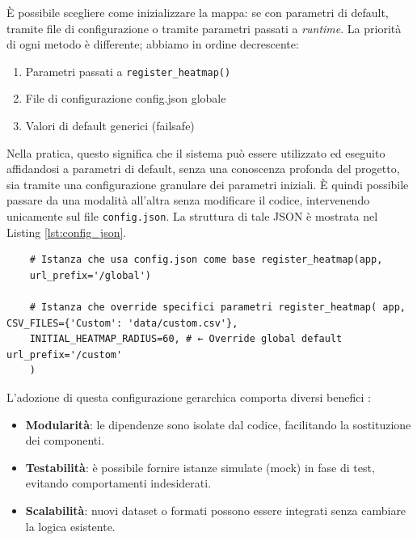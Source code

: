 È possibile scegliere come inizializzare la mappa: se con parametri di default, tramite
file di configurazione o tramite parametri passati a \textit{runtime}. La priorità
di ogni metodo è differente; abbiamo in ordine decrescente:

\begin{enumerate}
  \item Parametri passati a \texttt{register\_heatmap()}

  \item File di configurazione config.json globale

  \item Valori di default generici (failsafe)
\end{enumerate}

\noindent
Nella pratica, questo significa che il sistema può essere utilizzato ed eseguito
affidandosi a parametri di default, senza una conoscenza profonda del progetto,
sia tramite una configurazione granulare dei parametri iniziali. È quindi possibile
passare da una modalità all'altra senza modificare il codice, intervenendo
unicamente sul file \texttt{config.json}. La struttura di tale JSON è mostrata
nel Listing \ref{lst:config_json}.

\begin{listing}
  [H]
  \caption{Metodi per inizializzare la mappa}
  \label{lst:register_hm}
  \begin{verbatim}
    # Istanza che usa config.json come base register_heatmap(app,
    url_prefix='/global')

    # Istanza che override specifici parametri register_heatmap( app, CSV_FILES={'Custom': 'data/custom.csv'},
    INITIAL_HEATMAP_RADIUS=60, # ← Override global default url_prefix='/custom'
    )
  \end{verbatim}
\end{listing}

\noindent
L'adozione di questa configurazione gerarchica comporta diversi benefici \cite{dependency-injection-wiki}:

\begin{itemize}
  \item \textbf{Modularità}: le dipendenze sono isolate dal codice, facilitando
    la sostituzione dei componenti.

  \item \textbf{Testabilità}: è possibile fornire istanze simulate (mock) in fase
    di test, evitando comportamenti indesiderati.

  \item \textbf{Scalabilità}: nuovi dataset o formati possono essere integrati senza
    cambiare la logica esistente.
\end{itemize}

